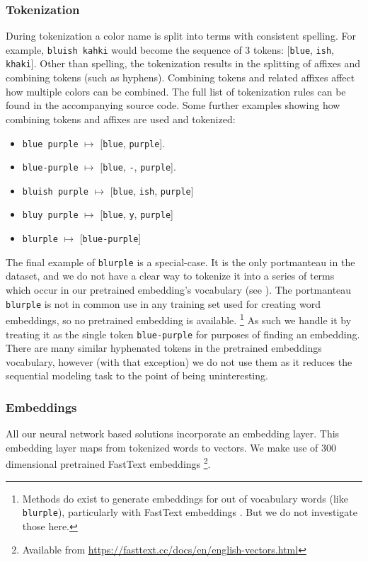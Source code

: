 \documentclass[]{clv3}
\newcommand{\parencite}{\citep}
\newcommand{\natlang}[1]{\texttt{#1}}
\begin{document}
\subsubsection{Tokenization}
During tokenization a color name is split into terms with consistent spelling.
For example, \natlang{bluish kahki} would become the sequence of 3 tokens: [\natlang{blue}, \natlang{ish}, \natlang{khaki}].
Other than spelling, the tokenization results in the splitting of affixes and combining tokens (such as hyphens).
Combining tokens and related affixes affect how multiple colors can be combined.
The full list of tokenization rules can be found in the accompanying source code.
Some further examples showing how combining tokens and affixes are used and tokenized:
\begin{itemize}
	\item \natlang{blue purple} $\mapsto$ [\natlang{blue}, \natlang{purple}].
	\item \natlang{blue-purple} $\mapsto$ [\natlang{blue}, \natlang{-}, \natlang{purple}].
	\item \natlang{bluish purple} $\mapsto$ [\natlang{blue}, \natlang{ish}, \natlang{purple}]
	\item \natlang{bluy purple} $\mapsto$ [\natlang{blue}, \natlang{y}, \natlang{purple}]
	\item \natlang{blurple} $\mapsto$ [\natlang{blue-purple}]
\end{itemize}
The final example of \natlang{blurple} is a special-case.
It is the only portmanteau in the dataset, and we do not have a clear way to tokenize it into a series of terms which occur in our pretrained embedding's vocabulary (see ).
The portmanteau \natlang{blurple} is not in common use in any training set used for creating word embeddings, so no pretrained embedding is available.%
\footnote{Methods do exist to generate embeddings for out of vocabulary words (like \natlang{blurple}), particularly with FastText embeddings \parencite{bojanowski2016enriching}. But we do not investigate those here.}
As such we handle it by treating it as the single token \natlang{blue-purple} for purposes of finding an embedding.
There are many similar hyphenated tokens in the pretrained embeddings vocabulary, however (with that exception) we do not use them as it reduces the sequential modeling task to the point of being uninteresting.




\subsubsection{Embeddings}\label{sec:embeddings} 
All our neural network based solutions incorporate an embedding layer.
This embedding layer maps from tokenized words to vectors.
We make use of 300 dimensional pretrained FastText embeddings \parencite{bojanowski2016enriching}\footnote{Available from \url{https://fasttext.cc/docs/en/english-vectors.html}}.
\end{document}
